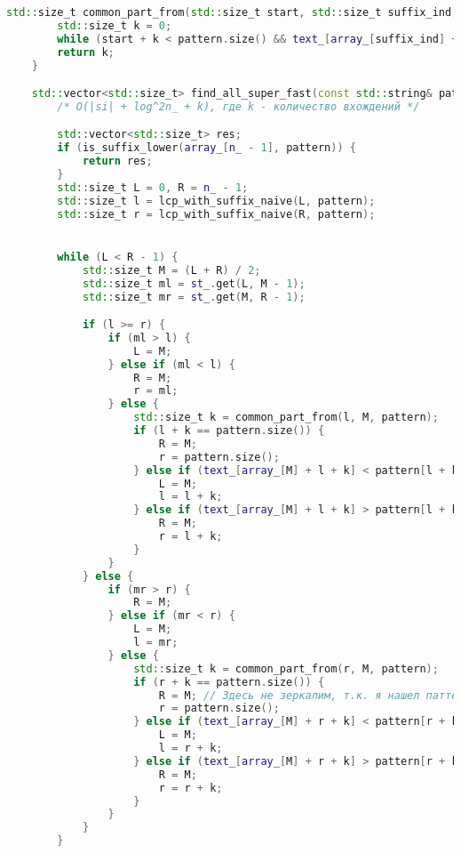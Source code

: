 \begin{lstlisting}[language=C++]
    std::size_t common_part_from(std::size_t start, std::size_t suffix_ind, const std::string& pattern) {
        std::size_t k = 0;
        while (start + k < pattern.size() && text_[array_[suffix_ind] + start + k] == pattern[start + k]) ++k;
        return k;
    }

    std::vector<std::size_t> find_all_super_fast(const std::string& pattern) {
        /* O(|si| + log^2n_ + k), где k - количество вхождений */

        std::vector<std::size_t> res;
        if (is_suffix_lower(array_[n_ - 1], pattern)) {
            return res;
        }
        std::size_t L = 0, R = n_ - 1;
        std::size_t l = lcp_with_suffix_naive(L, pattern);
        std::size_t r = lcp_with_suffix_naive(R, pattern);


        while (L < R - 1) {
            std::size_t M = (L + R) / 2;
            std::size_t ml = st_.get(L, M - 1);
            std::size_t mr = st_.get(M, R - 1);

            if (l >= r) {
                if (ml > l) {
                    L = M;
                } else if (ml < l) {
                    R = M;
                    r = ml;
                } else {
                    std::size_t k = common_part_from(l, M, pattern);
                    if (l + k == pattern.size()) {
                        R = M;
                        r = pattern.size();
                    } else if (text_[array_[M] + l + k] < pattern[l + k]) {
                        L = M;
                        l = l + k;
                    } else if (text_[array_[M] + l + k] > pattern[l + k]) {
                        R = M;
                        r = l + k;
                    }
                }
            } else {
                if (mr > r) {
                    R = M;
                } else if (mr < r) {
                    L = M;
                    l = mr;
                } else {
                    std::size_t k = common_part_from(r, M, pattern);
                    if (r + k == pattern.size()) {
                        R = M; // Здесь не зеркалим, т.к. я нашел паттерн и я хочу, чтобы справа были >=
                        r = pattern.size();
                    } else if (text_[array_[M] + r + k] < pattern[r + k]) {
                        L = M;
                        l = r + k;
                    } else if (text_[array_[M] + r + k] > pattern[r + k]) {
                        R = M;
                        r = r + k;
                    }
                }
            }
        }


\end{lstlisting}
